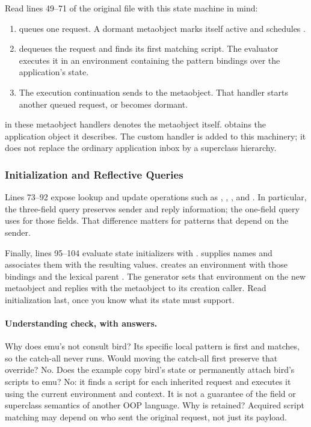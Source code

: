 Read lines 49--71 of the original file with this state machine in mind:
\begin{enumerate}[nosep]
  \item {} queues one request.
        A dormant metaobject marks itself active and schedules .
  \item {} dequeues the request and finds its first matching
        script. The evaluator executes it in an environment containing
        the pattern bindings over the application's state.
  \item The execution continuation sends  to the metaobject.
        That handler starts another queued request, or becomes dormant.
\end{enumerate}
 in these metaobject handlers denotes the metaobject itself.
\code{[den Me]} obtains the application object it describes.
The custom  handler is added to this machinery; it does
not replace the ordinary application inbox by a superclass hierarchy.

\subsubsection{Initialization and Reflective Queries}

Lines 73--92 expose lookup and update operations such as ,
, , and .
In particular, the three-field  query preserves sender
and reply information; the one-field query uses  for those fields.
That difference matters for patterns that depend on the sender.

Finally, lines 95--104 evaluate state initializers with .
 supplies names and  associates
them with the resulting values.  creates an environment
with those bindings and the lexical parent .
The generator sets that environment on the new metaobject and replies
with the metaobject to its creation caller.
Read initialization last, once you know what its state must support.

\paragraph{Understanding check, with answers.}
Why does emu's  not consult bird?
Its specific local pattern is first and matches, so the catch-all never runs.
Would moving the catch-all first preserve that override? No.
Does the example copy bird's state or permanently attach bird's scripts
to emu? No: it finds a script for each inherited request and executes it
using the current environment and context. It is not a guarantee of the
field or superclass semantics of another OOP language.
Why is  retained? Acquired script matching may depend
on who sent the original request, not just its payload.


